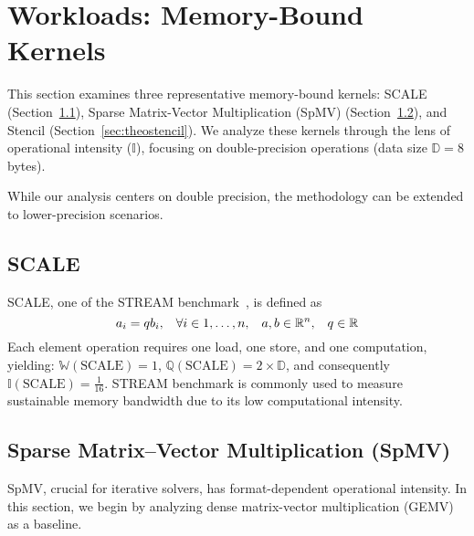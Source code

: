 

\section{Workloads: Memory-Bound Kernels}\label{sec:workload}

This section examines three representative memory-bound kernels: SCALE (Section~\ref{sec:theoscale}), Sparse Matrix-Vector Multiplication (SpMV) (Section~\ref{sec:theospmv}), and Stencil (Section~\ref{sec:theostencil}). We analyze these kernels through the lens of operational intensity ($\mathbb{I}$), focusing on double-precision operations (data size $\mathbb{D}=8$ bytes). %

While our analysis centers on double precision, the methodology can be extended to lower-precision scenarios.

\subsection{SCALE}\label{sec:theoscale}
SCALE, one of the STREAM benchmark~\cite{McCalpin2007}, is defined as
\begin{equation}\footnotesize
a_i = qb_i, \quad \forall i \in {1,\ldots,n}, \quad a,b \in \mathbb{R}^n, \quad q \in \mathbb{R}
\end{equation}
Each element operation requires one load, one store, and one computation, yielding: $\mathbb{W}(\text{SCALE})=1$, $\mathbb{Q}(\text{SCALE})=2\times\mathbb{D}$, and consequently $\mathbb{I}(\text{SCALE})=\tfrac{1}{16}$. STREAM benchmark is commonly used to measure sustainable memory bandwidth due to its low computational intensity.

\subsection{Sparse Matrix–Vector Multiplication (SpMV)} \label{sec:theospmv}
SpMV, crucial for iterative solvers, has format-dependent operational intensity. In this section, we begin by analyzing dense matrix-vector multiplication (GEMV) as a baseline.

